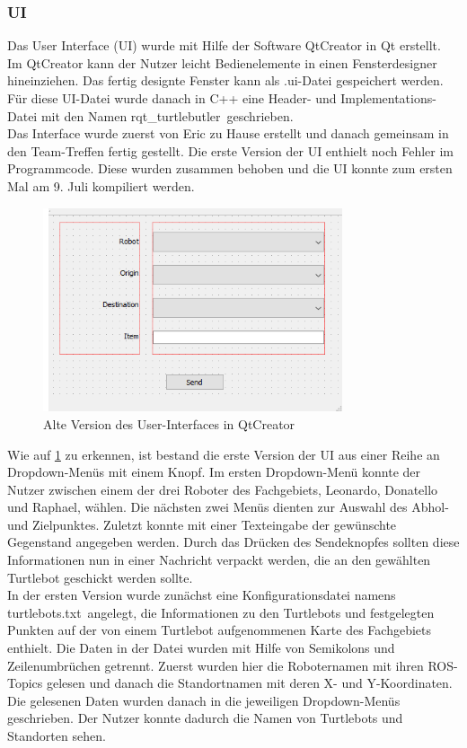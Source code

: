 \documentclass[a4paper,12pt,headsepline]{scrartcl}
\begin{document}
	\subsubsection{UI}
		Das User Interface (UI) wurde mit Hilfe der Software QtCreator in Qt erstellt. Im QtCreator kann der Nutzer leicht Bedienelemente in einen Fensterdesigner hineinziehen. Das fertig designte Fenster kann als \glqq .ui\grqq-Datei gespeichert werden. Für diese UI-Datei wurde danach in C++ eine Header- und Implementations-Datei mit den Namen \glqq rqt{\_}turtlebutler\grqq\ geschrieben.\\
		Das Interface wurde zuerst von Eric zu Hause erstellt und danach gemeinsam in den Team-Treffen fertig gestellt. Die erste Version der UI enthielt noch Fehler im Programmcode. Diese wurden zusammen behoben und die UI konnte zum ersten Mal am 9. Juli kompiliert werden.
		\begin{figure} [H]
			\centering
			\includegraphics[height=6cm]{Images/Turtlebutler_Old.png}
			\caption{Alte Version des User-Interfaces in QtCreator}
			\label{fig:OldUI}
		\end{figure}
		Wie auf \cref{fig:OldUI} zu erkennen, ist bestand die erste Version der UI aus einer Reihe an Dropdown-Menüs mit einem Knopf. Im ersten Dropdown-Menü konnte der Nutzer zwischen einem der drei Roboter des Fachgebiets, Leonardo, Donatello und Raphael, wählen. Die nächsten zwei Menüs dienten zur Auswahl des Abhol- und Zielpunktes. Zuletzt konnte mit einer Texteingabe der gewünschte Gegenstand angegeben werden. Durch das Drücken des Sendeknopfes sollten diese Informationen nun in einer Nachricht verpackt werden, die an den gewählten Turtlebot geschickt werden sollte.\\
		In der ersten Version wurde zunächst eine Konfigurationsdatei namens \glqq turtlebots.txt\grqq\ angelegt, die Informationen zu den Turtlebots und festgelegten Punkten auf der von einem Turtlebot aufgenommenen Karte des Fachgebiets enthielt. Die Daten in der Datei wurden mit Hilfe von Semikolons und Zeilenumbrüchen getrennt. Zuerst wurden hier die Roboternamen mit ihren ROS-Topics gelesen und danach die Standortnamen mit deren X- und Y-Koordinaten.  Die gelesenen Daten wurden danach in die jeweiligen Dropdown-Menüs geschrieben. Der Nutzer konnte dadurch die Namen von Turtlebots und Standorten sehen.\\
\end{document}

